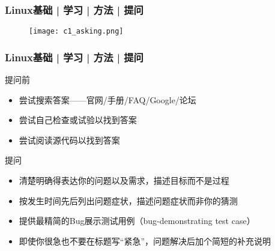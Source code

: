 \begin{frame}
  \frametitle{Linux基础 | 学习 | 方法 | \alert{提问}}
  \begin{figure}
    \centering
    \texttt{[image: c1\_asking.png]}
  \end{figure}
\end{frame}

\begin{frame}
  \frametitle{Linux基础 | 学习 | 方法 | \alert{提问}}
    \begin{block}{提问前}
      \begin{itemize}
        \item 尝试搜索答案——官网/手册/FAQ/Google/论坛
        \item 尝试自己检查或试验以找到答案
        \item 尝试阅读源代码以找到答案
      \end{itemize}
    \end{block}
    \pause
    \begin{block}{提问}
      \begin{itemize}
        \item 清楚明确得表达你的问题以及需求，描述目标而不是过程
        \item 按发生时间先后列出问题症状，描述问题症状而非你的猜测
        \item 提供最精简的Bug展示测试用例（bug-demonstrating test case）
        \item 即使你很急也不要在标题写“紧急”，问题解决后加个简短的补充说明
      \end{itemize}
    \end{block}
\end{frame}

